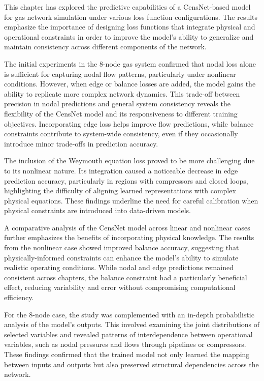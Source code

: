 This chapter has explored the predictive capabilities of a CensNet-based model for gas network simulation under various loss function configurations. The results emphasize the importance of designing loss functions that integrate physical and operational constraints in order to improve the model's ability to generalize and maintain consistency across different components of the network.

The initial experiments in the 8-node gas system confirmed that nodal loss alone is sufficient for capturing nodal flow patterns, particularly under nonlinear conditions. However, when edge or balance losses are added, the model gains the ability to replicate more complex network dynamics. This trade-off between precision in nodal predictions and general system consistency reveals the flexibility of the CensNet model and its responsiveness to different training objectives. Incorporating edge loss helps improve flow predictions, while balance constraints contribute to system-wide consistency, even if they occasionally introduce minor trade-offs in prediction accuracy.


The inclusion of the Weymouth equation loss proved to be more challenging due to its nonlinear nature. Its integration caused a noticeable decrease in edge prediction accuracy, particularly in regions with compressors and closed loops, highlighting the difficulty of aligning learned representations with complex physical equations. These findings underline the need for careful calibration when physical constraints are introduced into data-driven models.

A comparative analysis of the CensNet model across linear and nonlinear cases further emphasizes the benefits of incorporating physical knowledge. The results from the nonlinear case showed improved balance accuracy, suggesting that physically-informed constraints can enhance the model’s ability to simulate realistic operating conditions. While nodal and edge predictions remained consistent across chapters, the balance constraint had a particularly beneficial effect, reducing variability and error without compromising computational efficiency.

For the 8-node case, the study was complemented with an in-depth probabilistic analysis of the model's outputs. This involved examining the joint distributions of selected variables and revealed patterns of interdependence between operational variables, such as nodal pressures and flows through pipelines or compressors. These findings confirmed that the trained model not only learned the mapping between inputs and outputs but also preserved structural dependencies across the network.

